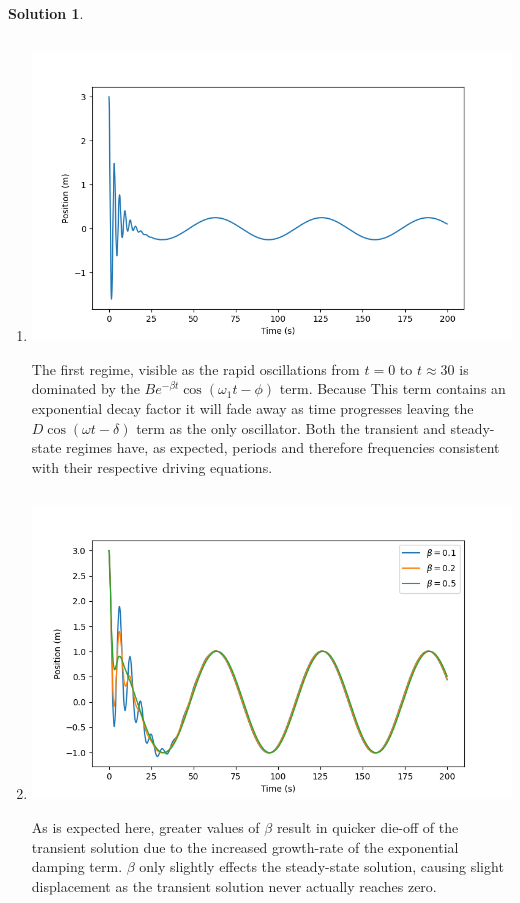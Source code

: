 \documentclass[10pt]{article}
\theoremstyle{definition}
\newtheorem{soln}{Solution}
\begin{document}
\begin{soln}
\begin{enumerate}[label=(\alph*)]
            \item \inputminted[breaklines, autogobble]{python3}{./python/q1/q1d.py}
                  \begin{center}
                        \includegraphics[scale=0.75]{Figure_1.png}
                  \end{center}
                  The first regime, visible as the rapid oscillations from $t=0$ to $t\approx 30$ is dominated by the $Be^{-\beta t}\cos\left(\omega_1 t-\phi\right)$ term. Because
                  This term contains an exponential decay factor it will fade away as time progresses leaving the $D\cos\left(\omega t-\delta\right)$ term as the only oscillator.
                  Both the transient and steady-state regimes have, as expected, periods and therefore frequencies consistent with their respective driving equations.

            \item \inputminted[breaklines, autogobble]{python3}{./python/q1/q1e.py}
                  \begin{center}
                        \includegraphics[scale=0.75]{Figure_2.png}
                  \end{center}
                  As is expected here, greater values of $\beta$ result in quicker die-off of the transient solution due to the increased growth-rate of the exponential damping term. 
                  $\beta$ only slightly effects the steady-state solution, causing slight displacement as the transient solution never actually reaches zero.


\end{enumerate}
\end{soln}
\end{document}
